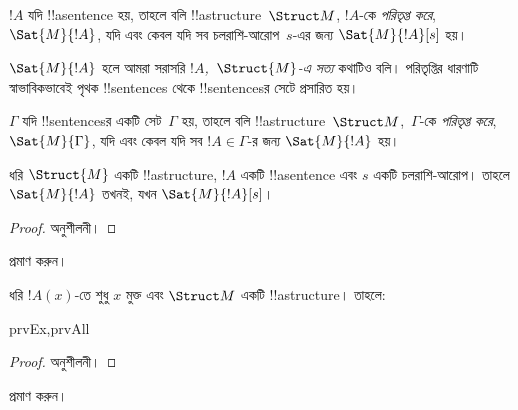 \documentclass[../../../include/open-logic-section]{subfiles}
\begin{document}
\begin{defn}
$!A$ যদি !!a{sentence} হয়, তাহলে বলি !!a{structure}~$\Struct M$,
$!A$-কে \emph{পরিতৃপ্ত করে}, $\Sat{M}{!A}$, যদি এবং কেবল যদি সব
চলরাশি-আরোপ~$s$-এর জন্য $\Sat{M}{!A}[s]$ হয়।
\end{defn}

$\Sat{M}{!A}$ হলে আমরা সরাসরি \emph{$!A$,~$\Struct{M}$-এ সত্য} কথাটিও
বলি। পরিতৃপ্তির ধারণাটি স্বাভাবিকভাবেই পৃথক !!{sentence}s থেকে
!!{sentence}sর সেটে প্রসারিত হয়।

\begin{defn}
$\Gamma$ যদি !!{sentence}sর একটি সেট~$\Gamma$ হয়, তাহলে বলি
!!a{structure}~$\Struct M$,~$\Gamma$-কে \emph{পরিতৃপ্ত করে},
$\Sat{M}{\Gamma}$, যদি এবং কেবল যদি সব $!A \in \Gamma$-র জন্য
$\Sat{M}{!A}$ হয়।
\end{defn}

\begin{prop}
  ধরি $\Struct{M}$ একটি !!a{structure}, $!A$ একটি !!a{sentence} এবং
  $s$ একটি চলরাশি-আরোপ। তাহলে $\Sat{M}{!A}$ তখনই, যখন
  $\Sat{M}{!A}[s]$।
\end{prop}

\begin{proof}
অনুশীলনী।
\end{proof}

\begin{prob}
 প্রমাণ করুন।
\end{prob}

\begin{prop}
  ধরি $!A(x)$-তে শুধু $x$ মুক্ত এবং $\Struct M$ একটি
  !!a{structure}। তাহলে:
  \begin{tagenumerate}{prvEx,prvAll}
\end{tagenumerate}
\end{prop}

\begin{proof}
অনুশীলনী।
\end{proof}

\begin{prob}
 প্রমাণ করুন।
\end{prob}
\end{document}
